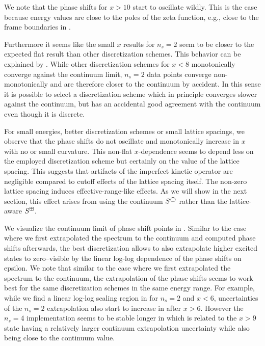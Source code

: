 We note that the phase shifts for $x > 10$ start to oscillate wildly.
This is the case because energy values are close to the poles of the zeta function, e.g., close to the frame boundaries in .

Furthermore it seems like the small $x$ results for $n_s = 2$ seem to be closer to the expected flat result than other discretization schemes.
This behavior can be explained by .
While other discretization schemes for $x < 8$ monotonically converge against the continuum limit, $n_s = 2$ data points converge non-monotonically and are therefore closer to the continuum by accident.
In this sense it is possible to select a discretization scheme which in principle converges slower against the continuum, but has an accidental good agreement with the continuum even though it is discrete.

For small energies, better discretization schemes or small lattice spacings, we observe that the phase shifts do not oscillate and monotonically increase in $x$ with no or small curvature.
This non-flat $x$-dependence seems to depend less on the employed discretization scheme but certainly on the value of the lattice spacing.
This suggests that artifacts of the imperfect kinetic operator are negligible compared to cutoff effects of the lattice spacing itself.
The non-zero lattice spacing induces effective-range-like effects.
As we will show in the next section, this effect arises from using the continuum $S^{\bigcirc}$ rather than the lattice-aware $S^{\boxplus}$.

We visualize the continuum limit of phase shift points in .
Similar to the case where we first extrapolated the spectrum to the continuum and computed phase shifts afterwards, the best discretization allows to also extrapolate higher excited states to zero--visible by the linear log-log dependence of the phase shifts on epsilon.
We note that similar to the case where we first extrapolated the spectrum to the continuum, the extrapolation of the phase shifts seems to work best for the same discretization schemes in the same energy range.
For example, while we find a linear log-log scaling region in  for $n_s = 2$ and $x<6$, uncertainties of the $n_s =2$ extrapolation also start to increase in  after $x>6$.
However the $n_s = 4$ implementation seems to be stable longer in  which is related to the $x>9$ state having a relatively larger continuum extrapolation uncertainty while also being close to the continuum value.

